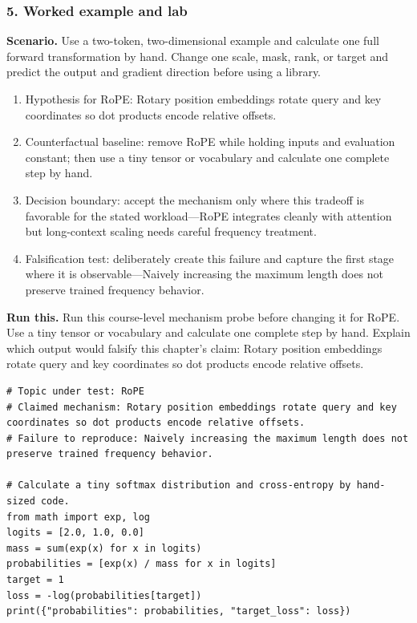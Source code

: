\subsubsection*{5. Worked example and lab}
\textbf{Scenario.} Use a two-token, two-dimensional example and calculate one full forward transformation by hand. Change one scale, mask, rank, or target and predict the output and gradient direction before using a library.
\begin{enumerate}
\item Hypothesis for RoPE: Rotary position embeddings rotate query and key coordinates so dot products encode relative offsets.
\item Counterfactual baseline: remove RoPE while holding inputs and evaluation constant; then use a tiny tensor or vocabulary and calculate one complete step by hand.
\item Decision boundary: accept the mechanism only where this tradeoff is favorable for the stated workload—RoPE integrates cleanly with attention but long-context scaling needs careful frequency treatment.
\item Falsification test: deliberately create this failure and capture the first stage where it is observable—Naively increasing the maximum length does not preserve trained frequency behavior.
\end{enumerate}
\textbf{Run this.} Run this course-level mechanism probe before changing it for RoPE. Use a tiny tensor or vocabulary and calculate one complete step by hand. Explain which output would falsify this chapter's claim: Rotary position embeddings rotate query and key coordinates so dot products encode relative offsets.
\begin{Verbatim}[fontsize=\scriptsize]
# Topic under test: RoPE
# Claimed mechanism: Rotary position embeddings rotate query and key coordinates so dot products encode relative offsets.
# Failure to reproduce: Naively increasing the maximum length does not preserve trained frequency behavior.

# Calculate a tiny softmax distribution and cross-entropy by hand-sized code.
from math import exp, log
logits = [2.0, 1.0, 0.0]
mass = sum(exp(x) for x in logits)
probabilities = [exp(x) / mass for x in logits]
target = 1
loss = -log(probabilities[target])
print({"probabilities": probabilities, "target_loss": loss})
\end{Verbatim}
